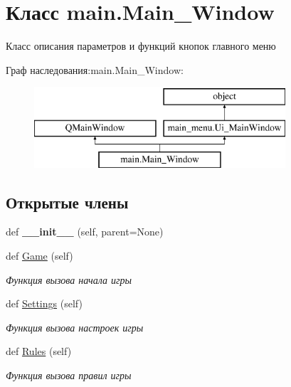 \hypertarget{classmain_1_1_main___window}{}\section{Класс main.\+Main\+\_\+\+Window}
\label{classmain_1_1_main___window}


Класс описания параметров и функций кнопок главного меню  


Граф наследования\+:main.\+Main\+\_\+\+Window\+:\begin{figure}[H]
\begin{center}
\leavevmode
\includegraphics[height=3.000000cm]{classmain_1_1_main___window}
\end{center}
\end{figure}
\subsection*{Открытые члены}
\begin{DoxyCompactItemize}
\item 
\mbox{\label{classmain_1_1_main___window_acefde145fb95483bba9213add92a0935}} 
def {\bfseries \+\_\+\+\_\+init\+\_\+\+\_\+} (self, parent=None)
\item 
\mbox{\label{classmain_1_1_main___window_a0c50fb17eb1e8f2452b597abb3555781}} 
def \mbox{\hyperlink{classmain_1_1_main___window_a0c50fb17eb1e8f2452b597abb3555781}{Game}} (self)
\begin{DoxyCompactList}\small\item\em Функция вызова начала игры \end{DoxyCompactList}\item 
\mbox{\label{classmain_1_1_main___window_a13a951e7b7b86f2163a65fadad80e9af}} 
def \mbox{\hyperlink{classmain_1_1_main___window_a13a951e7b7b86f2163a65fadad80e9af}{Settings}} (self)
\begin{DoxyCompactList}\small\item\em Функция вызова настроек игры \end{DoxyCompactList}\item 
\mbox{\label{classmain_1_1_main___window_a23677aa624a8c295bfcd46f01915764b}} 
def \mbox{\hyperlink{classmain_1_1_main___window_a23677aa624a8c295bfcd46f01915764b}{Rules}} (self)
\begin{DoxyCompactList}\small\item\em Функция вызова правил игры \end{DoxyCompactList}\end{DoxyCompactItemize}
